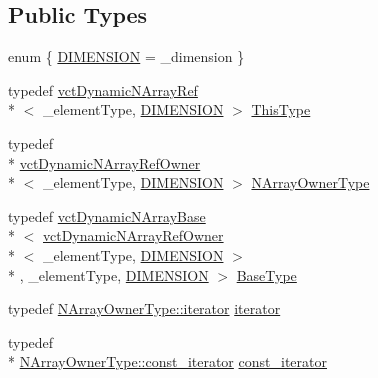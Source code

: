 \subsection*{Public Types}
\begin{DoxyCompactItemize}
\item 
enum \{ \hyperlink{classvct_dynamic_n_array_ref_a92161a3e7a42576d3442eaf7bae097c1aa639cdab72a595c9cb324af98946bab5}{D\-I\-M\-E\-N\-S\-I\-O\-N} = \-\_\-dimension
 \}
\item 
typedef \hyperlink{classvct_dynamic_n_array_ref}{vct\-Dynamic\-N\-Array\-Ref}\\*
$<$ \-\_\-element\-Type, \hyperlink{classvct_dynamic_n_array_ref_a92161a3e7a42576d3442eaf7bae097c1aa639cdab72a595c9cb324af98946bab5}{D\-I\-M\-E\-N\-S\-I\-O\-N} $>$ \hyperlink{classvct_dynamic_n_array_ref_a157266ffe0ad737f4df13dcf499a4494}{This\-Type}
\item 
typedef \\*
\hyperlink{classvct_dynamic_n_array_ref_owner}{vct\-Dynamic\-N\-Array\-Ref\-Owner}\\*
$<$ \-\_\-element\-Type, \hyperlink{classvct_dynamic_n_array_ref_a92161a3e7a42576d3442eaf7bae097c1aa639cdab72a595c9cb324af98946bab5}{D\-I\-M\-E\-N\-S\-I\-O\-N} $>$ \hyperlink{classvct_dynamic_n_array_ref_a64f8693e4cbab79b5b73e1e3a8620dca}{N\-Array\-Owner\-Type}
\item 
typedef \hyperlink{classvct_dynamic_n_array_base}{vct\-Dynamic\-N\-Array\-Base}\\*
$<$ \hyperlink{classvct_dynamic_n_array_ref_owner}{vct\-Dynamic\-N\-Array\-Ref\-Owner}\\*
$<$ \-\_\-element\-Type, \hyperlink{classvct_dynamic_n_array_ref_a92161a3e7a42576d3442eaf7bae097c1aa639cdab72a595c9cb324af98946bab5}{D\-I\-M\-E\-N\-S\-I\-O\-N} $>$\\*
, \-\_\-element\-Type, \hyperlink{classvct_dynamic_n_array_ref_a92161a3e7a42576d3442eaf7bae097c1aa639cdab72a595c9cb324af98946bab5}{D\-I\-M\-E\-N\-S\-I\-O\-N} $>$ \hyperlink{classvct_dynamic_n_array_ref_a05a9add95925f07f6bc955f7623f39d0}{Base\-Type}
\item 
typedef \hyperlink{classvct_dynamic_n_array_ref_owner_a9d68370074a5320a30354e700207ad71}{N\-Array\-Owner\-Type\-::iterator} \hyperlink{classvct_dynamic_n_array_ref_a790307f3b784640fd845e3a7f548374f}{iterator}
\item 
typedef \\*
\hyperlink{classvct_dynamic_n_array_ref_owner_ab6652472746656a9be2de178295fd80b}{N\-Array\-Owner\-Type\-::const\-\_\-iterator} \hyperlink{classvct_dynamic_n_array_ref_adcf4caa9e0d51a28f2baebabecc9a38b}{const\-\_\-iterator}

\end{DoxyCompactItemize}
